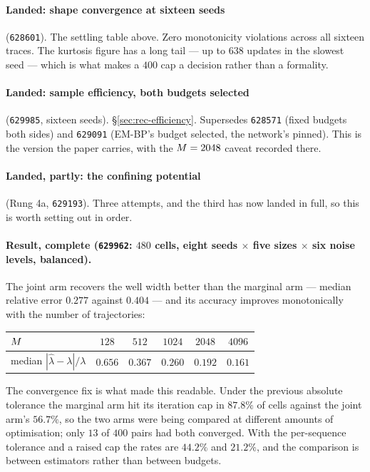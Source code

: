 \paragraph{Landed: shape convergence at sixteen seeds} (\texttt{628601}). The settling table above.
Zero monotonicity violations across all sixteen traces. The kurtosis figure has a long tail --- up
to $638$ updates in the slowest seed --- which is what makes a $400$ cap a decision rather than a
formality.

\paragraph{Landed: sample efficiency, both budgets selected} (\texttt{629985}, sixteen seeds).
\S\ref{sec:rec-efficiency}. Supersedes \texttt{628571} (fixed budgets both sides) and
\texttt{629091} (EM-BP's budget selected, the network's pinned). This is the version the paper
carries, with the $M=2048$ caveat recorded there.

\paragraph{Landed, partly: the confining potential} (Rung 4a, \texttt{629193}).
\label{sec:rung4a-status}
Three attempts, and the third has now landed in full, so this is worth setting out in order.

\paragraph{Result, complete (\texttt{629962}: $480$ cells, eight seeds $\times$ five sizes
$\times$ six noise levels, balanced).} The joint arm recovers the well width better than the
marginal arm --- median relative error $0.277$ against $0.404$ --- and its accuracy improves
monotonically with the number of trajectories:

\begin{center}\small
\begin{tabular}{@{}lccccc@{}}
\toprule
$M$ & $128$ & $512$ & $1024$ & $2048$ & $4096$ \\
\midrule
median $|\hat\lambda-\lambda|/\lambda$ & $0.656$ & $0.367$ & $0.260$ & $0.192$ & $0.161$ \\
\bottomrule
\end{tabular}
\end{center}

\noindent
The convergence fix is what made this readable. Under the previous absolute tolerance the
marginal arm hit its iteration cap in $87.8\%$ of cells against the joint arm's $56.7\%$, so the
two arms were being compared at different amounts of optimisation; only $13$ of $400$ pairs had
both converged. With the per-sequence tolerance and a raised cap the rates are $44.2\%$ and
$21.2\%$, and the comparison is between estimators rather than between budgets.

